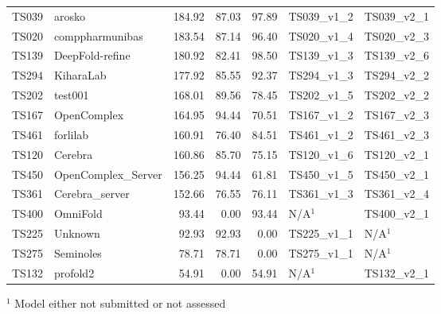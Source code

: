 \begin{table}[ht]
{\begin{tabular}{llrrrll}
TS039 & arosko & 184.92 & 87.03 & 97.89 & TS039\_v1\_2 & TS039\_v2\_1 \\ 
TS020 & comppharmunibas & 183.54 & 87.14 & 96.40 & TS020\_v1\_4 & TS020\_v2\_3 \\ 
TS139 & DeepFold-refine & 180.92 & 82.41 & 98.50 & TS139\_v1\_3 & TS139\_v2\_6 \\ 
TS294 & KiharaLab & 177.92 & 85.55 & 92.37 & TS294\_v1\_3 & TS294\_v2\_2 \\ 
TS202 & test001 & 168.01 & 89.56 & 78.45 & TS202\_v1\_5 & TS202\_v2\_2 \\ 
TS167 & OpenComplex & 164.95 & 94.44 & 70.51 & TS167\_v1\_2 & TS167\_v2\_3 \\ 
TS461 & forlilab & 160.91 & 76.40 & 84.51 & TS461\_v1\_2 & TS461\_v2\_3 \\ 
TS120 & Cerebra & 160.86 & 85.70 & 75.15 & TS120\_v1\_6 & TS120\_v2\_1 \\ 
TS450 & OpenComplex\_Server & 156.25 & 94.44 & 61.81 & TS450\_v1\_5 & TS450\_v2\_1 \\ 
TS361 & Cerebra\_server & 152.66 & 76.55 & 76.11 & TS361\_v1\_3 & TS361\_v2\_4 \\ 
TS400 & OmniFold & 93.44 & 0.00 & 93.44 & N/A$^{1}$ & TS400\_v2\_1 \\ 
TS225 & Unknown & 92.93 & 92.93 & 0.00 & TS225\_v1\_1 & N/A$^{1}$ \\ 
TS275 & Seminoles & 78.71 & 78.71 & 0.00 & TS275\_v1\_1 & N/A$^{1}$ \\ 
TS132 & profold2 & 54.91 & 0.00 & 54.91 & N/A$^{1}$ & TS132\_v2\_1 \\ 
\bottomrule
\end{tabular}%
}
\begin{flushleft}\footnotesize $^{1}$ Model either not submitted or not assessed\end{flushleft}
\end{table}

